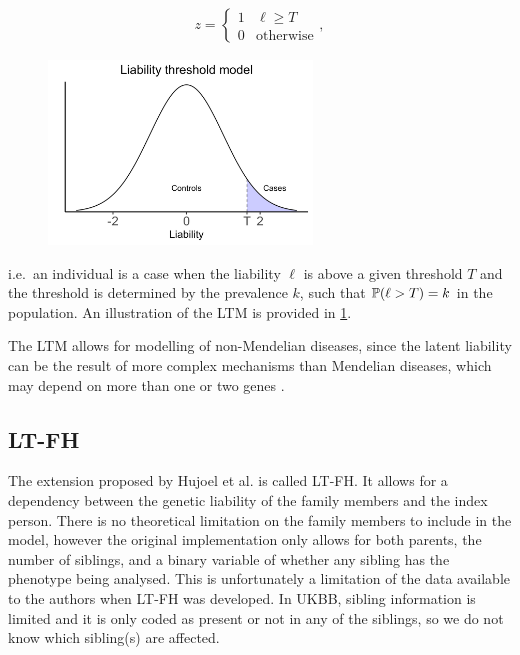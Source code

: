 \begin{align*}
z = 
\begin{cases}
1 & \ell \geq T \\
0 & \text{otherwise}
\end{cases},
\end{align*}
\begin{figure}
	\includegraphics[width=7cm]{methods/LTM.png}
	\label{fig:methods:LTMplot}
\end{figure}
i.e.\ an individual is a case when the liability $ \ell $ is above a given threshold $ T $ and the threshold is determined by the prevalence $ k $, such that $ \mathbb{P}(\ell > T) = k $ in the population. An illustration of the LTM is provided in \cref{fig:methods:LTMplot}.

The LTM allows for modelling of non-Mendelian diseases, since the latent liability can be the result of more complex mechanisms than Mendelian diseases, which may depend on more than one or two genes \cite{falconer1967inheritance,falconer1965inheritance}. 


\subsection{LT-FH}
The extension proposed by Hujoel et al.\cite{hujoel2020liability} is called LT-FH. It allows for a dependency between the genetic liability of the family members and the index person. There is no theoretical limitation on the family members to include in the model, however the original implementation only allows for both parents, the number of siblings, and a binary variable of whether any sibling has the phenotype being analysed. This is unfortunately a limitation of the data available to the authors when LT-FH was developed. In UKBB, sibling information is limited and it is only coded as present or not in any of the siblings, so we do not know which sibling(s) are affected. 

